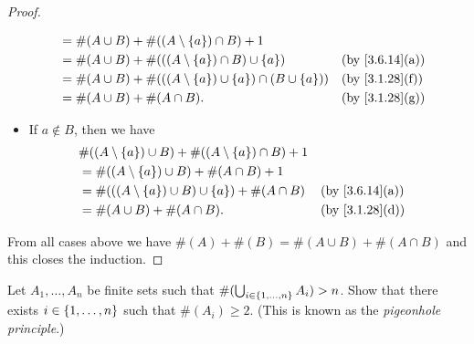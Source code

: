 \begin{proof}
\begin{itemize}
\begin{align*}
			       & = \#(A \cup B) + \#((A \setminus \set{a}) \cap B) + 1                                                             \\
			       & = \#(A \cup B) + \#(((A \setminus \set{a}) \cap B) \cup \set{a})                &  & \text{(by \cref{3.6.14}(a))} \\
			       & = \#(A \cup B) + \#(((A \setminus \set{a}) \cup \set{a}) \cap (B \cup \set{a})) &  & \text{(by \cref{3.1.28}(f))} \\
			       & = \#(A \cup B) + \#(A \cap B).                                                  &  & \text{(by \cref{3.1.28}(g))}
		      \end{align*}
		\item If \(a \notin B\), then we have
		      \begin{align*}
			       & \#((A \setminus \set{a}) \cup B) + \#((A \setminus \set{a}) \cap B) + 1                                   \\
			       & = \#((A \setminus \set{a}) \cup B) + \#(A \cap B) + 1                                                     \\
			       & = \#(((A \setminus \set{a}) \cup B) \cup \set{a}) + \#(A \cap B)        &  & \text{(by \cref{3.6.14}(a))} \\
			       & = \#(A \cup B) + \#(A \cap B).                                          &  & \text{(by \cref{3.1.28}(d))}
		      \end{align*}
	\end{itemize}
	From all cases above we have \(\#(A) + \#(B) = \#(A \cup B) + \#(A \cap B)\) and this closes the induction.
\end{proof}

\begin{ex}\label{ex:3.6.10}
	Let \(A_1, \dots, A_n\) be finite sets such that \(\#(\bigcup_{i \in \left\lbrace1, \dots, n\right\rbrace} A_i) > n\).
	Show that there exists \(i \in \left\lbrace1, \dots, n\right\rbrace\) such that \(\#(A_i) \geq 2\).
	(This is known as the \emph{pigeonhole principle}.)
\end{ex}


